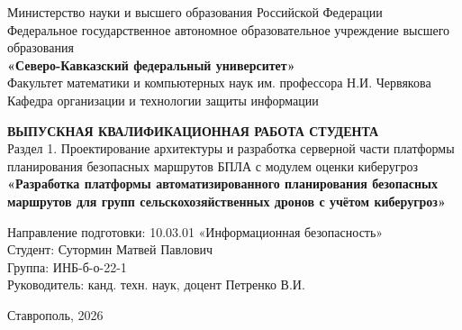 \documentclass[14pt,a4paper]{extarticle}
\begin{document}
\begin{titlepage}
\begin{center}
Министерство науки и высшего образования Российской Федерации\\
Федеральное государственное автономное образовательное учреждение высшего образования\\
\textbf{«Северо-Кавказский федеральный университет»}\\[0.5cm]
Факультет математики и компьютерных наук им. профессора Н.И. Червякова\\
Кафедра организации и технологии защиты информации
\end{center}

\vfill

\begin{center}
\textbf{ВЫПУСКНАЯ КВАЛИФИКАЦИОННАЯ РАБОТА СТУДЕНТА}\\[0.4cm]
Раздел 1. Проектирование архитектуры и разработка серверной части платформы планирования безопасных маршрутов БПЛА с модулем оценки киберугроз\\[0.8cm]
\textbf{«Разработка платформы автоматизированного планирования безопасных маршрутов для групп сельскохозяйственных дронов с учётом киберугроз»}
\end{center}

\vfill

\begin{flushright}
Направление подготовки: 10.03.01 «Информационная безопасность»\\
Студент: Сутормин Матвей Павлович\\
Группа: ИНБ-б-о-22-1\\[0.4cm]
Руководитель: канд. техн. наук, доцент Петренко В.И.
\end{flushright}

\vfill

\begin{center}
Ставрополь, 2026
\end{center}
\end{titlepage}


\clearpage

\tableofcontents
\clearpage


\end{document}
